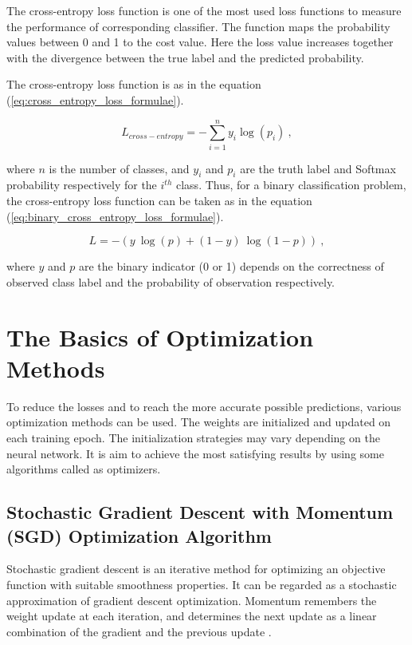 The cross-entropy loss function is one of the most used loss functions to measure the performance of corresponding classifier. The function maps the probability values between 0 and 1 to the cost value. Here the loss value increases together with the divergence between the true label and the predicted probability.

The cross-entropy loss function is as in the equation (\ref{eq:cross_entropy_loss_formulae}).

\begin{equation}
	\label{eq:cross_entropy_loss_formulae}
	L_{cross-entropy} = - \sum_{i=1}^{n} y_{i} \log(p_{i}) \:,
\end{equation}

where $n$ is the number of classes, and $y_{i}$ and $p_{i}$ are the truth label and Softmax probability respectively for the $i^{th}$ class. Thus, for a binary classification problem, the cross-entropy loss function can be taken as in the equation (\ref{eq:binary_cross_entropy_loss_formulae}).

\begin{equation}
	\label{eq:binary_cross_entropy_loss_formulae}
	L = - \left ( y\:\log(p) + (1 - y)\:\log(1-p) \right ) \:,
\end{equation}

where $y$ and $p$ are the binary indicator (0 or 1) depends on the correctness of observed class label and the probability of observation respectively.

\section{The Basics of Optimization Methods}
\label{sec:CH3_the_basics_of_optimization}

To reduce the losses and to reach the more accurate possible predictions, various optimization methods can be used. The weights are initialized and updated on each training epoch. The initialization strategies may vary depending on the neural network. It is aim to achieve the most satisfying results by using some algorithms called as optimizers.

\subsection{Stochastic Gradient Descent with Momentum (SGD) Optimization Algorithm}

Stochastic gradient descent is an iterative method for optimizing an objective function with suitable smoothness properties. It can be regarded as a stochastic approximation of gradient descent optimization. Momentum remembers the weight update at each iteration, and determines the next update as a linear combination of the gradient and the previous update \cite{SGD_Momentum}.

